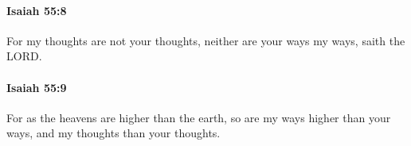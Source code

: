 		\paragraph{Isaiah 55:8} %
			\label{ISAIAH-55-8}

			For my thoughts are not your thoughts, neither are your ways my ways, saith the LORD.


		\paragraph{Isaiah 55:9} %
			\label{ISAIAH-55-9}

			For as the heavens are higher than the earth, so are my ways higher than your ways, and my thoughts than your thoughts.


